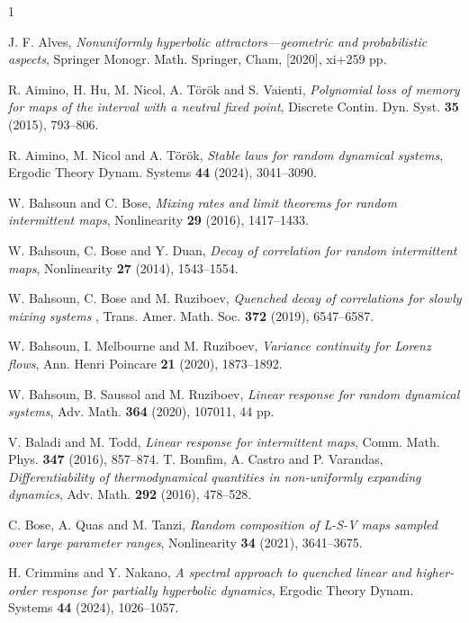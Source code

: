 \documentclass[12pt,reqno,a4paper]{article}
\begin{document}
\begin{thebibliography}{1}
	
	J. F. Alves, \emph{Nonuniformly hyperbolic attractors—geometric and probabilistic aspects}, Springer Monogr. Math.
	Springer, Cham, [2020], xi+259 pp.
	
	
	R. Aimino, H. Hu, M. Nicol, A. T\"{o}r\"{o}k and S. Vaienti, \emph{Polynomial loss of memory for maps of the interval with a neutral fixed point}, Discrete Contin. Dyn. Syst. \textbf{35} (2015),  793--806.
	
	 R. Aimino, M. Nicol and A. T{\"o}r{\"o}k, 
	\emph{Stable laws for random dynamical systems}, 
	Ergodic Theory Dynam. Systems \textbf{44} (2024), 
	3041--3090.
	
	W. Bahsoun and  C. Bose, \emph{Mixing rates and limit theorems for random intermittent maps},  Nonlinearity
	\textbf{29} (2016), 1417--1433.
	
	
	W. Bahsoun, C. Bose and  Y. Duan, \emph{Decay of correlation for random intermittent maps}, Nonlinearity
	\textbf{27} (2014), 1543--1554.
	
	W. Bahsoun, C. Bose and M. Ruziboev, \emph{Quenched decay of correlations for slowly mixing systems
	}, Trans. Amer. Math. Soc. \textbf{372} (2019), 6547--6587.
	
	W. Bahsoun, I. Melbourne and M. Ruziboev, \emph{Variance continuity for Lorenz flows}, Ann. Henri Poincare \textbf{21} (2020),  1873--1892.
	
	W. Bahsoun, B. Saussol and M. Ruziboev, \emph{Linear response for random dynamical systems}, Adv. Math. \textbf{364} (2020), 107011, 44 pp.
	
	V. Baladi and M. Todd,  \emph{Linear response for intermittent maps}, Comm. Math. Phys. \textbf{347} (2016),  857--874.
	T. Bomfim, A. Castro and P. Varandas, \emph{Differentiability of thermodynamical quantities in
		non-uniformly expanding dynamics}, Adv. Math. \textbf{292} (2016), 478--528.
	
	C. Bose, A. Quas and M. Tanzi, \emph{Random composition of L-S-V maps sampled over large parameter ranges}, Nonlinearity \textbf{34} (2021),  3641--3675.
	
	H. Crimmins and Y. Nakano, \emph{A spectral approach to quenched linear and higher-order response for partially hyperbolic dynamics}, Ergodic Theory Dynam. Systems \textbf{44} (2024),  1026--1057.
	

\end{thebibliography}
\end{document}
